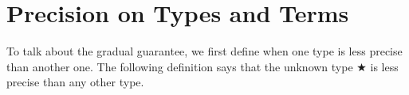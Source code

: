 \section{Precision on Types and Terms}
\label{sec:precision}

To talk about the gradual guarantee, we first define when one type is
less precise than another one. The following definition says that the
unknown type ★ is less precise than any other type.

\begin{code}%
\>[0]\AgdaSpace{}%
\AgdaSpace{}%
\<%
\\
\>[0]\AgdaSpace{}%
\AgdaSpace{}%
\AgdaSymbol{:}\AgdaSpace{}%
\AgdaSpace{}%
\AgdaSpace{}%
\AgdaSpace{}%
\AgdaSpace{}%
\AgdaSpace{}%
\<%
\\
\>[0][@{}l@{\AgdaIndent{0}}]%
\>[2]\AgdaSpace{}%
\AgdaSymbol{:}\AgdaSpace{}%
\AgdaSpace{}%
\AgdaSpace{}%
\<%
\\
%
\>[2]\AgdaSpace{}%
\AgdaSymbol{:}\AgdaSpace{}%
\AgdaSymbol{\}\{}\AgdaSymbol{\}}\AgdaSpace{}%
\AgdaSpace{}%
\AgdaSpace{}%
\AgdaSpace{}%
\AgdaSpace{}%
\AgdaSpace{}%
\AgdaSpace{}%
\AgdaSpace{}%
\AgdaSpace{}%
\AgdaSpace{}%
\<%
\\
%
\>[2]\AgdaSpace{}%
\AgdaSymbol{:}\AgdaSpace{}%
\AgdaSymbol{\}}\AgdaSpace{}%
\AgdaSpace{}%
\AgdaSpace{}%
\AgdaSpace{}%
\AgdaSpace{}%
\AgdaSpace{}%
\<%
\\
%
\>[2]\AgdaSpace{}%
\AgdaSymbol{:}\AgdaSpace{}%
\AgdaSpace{}%
\AgdaSpace{}%
\AgdaSpace{}%
\AgdaSymbol{\}}%
\>[21]%
\>[24]\AgdaSpace{}%
\AgdaSpace{}%
%
\>[31]%
\>[34]\AgdaSpace{}%
\AgdaSpace{}%
%
\>[41]%
\>[44]\AgdaSpace{}%
\AgdaSpace{}%
\AgdaSpace{}%
\AgdaSpace{}%
\AgdaSpace{}%
\AgdaSpace{}%
\<%
\end{code}


